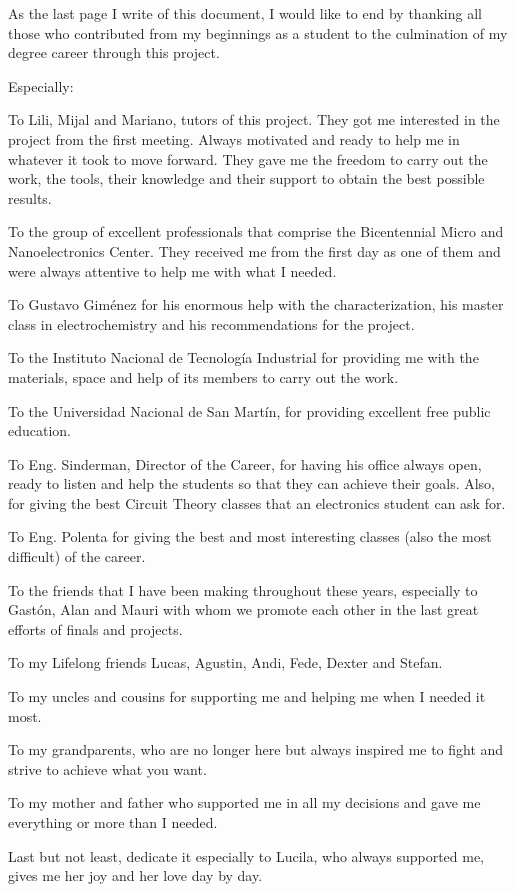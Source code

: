 
As the last page I write of this document, I would like to end by thanking all those who contributed from my beginnings as a student to the culmination of my degree career through this project.

Especially:

To Lili, Mijal and Mariano, tutors of this project. They got me interested in the project from the first meeting. Always motivated and ready to help me in whatever it took to move forward. They gave me the freedom to carry out the work, the tools, their knowledge and their support to obtain the best possible results.

To the group of excellent professionals that comprise the Bicentennial Micro and Nanoelectronics Center. They received me from the first day as one of them and were always attentive to help me with what I needed.

To Gustavo Giménez for his enormous help with the characterization, his master class in electrochemistry and his recommendations for the project.

To the Instituto Nacional de Tecnología Industrial for providing me with the materials, space and help of its members to carry out the work.

To the Universidad Nacional de San Martín, for providing excellent free public education.

To Eng. Sinderman, Director of the Career, for having his office always open, ready to listen and help the students so that they can achieve their goals. Also, for giving the best Circuit Theory classes that an electronics student can ask for.

To Eng. Polenta for giving the best and most interesting classes (also the most difficult) of the career.

To the friends that I have been making throughout these years, especially to Gastón, Alan and Mauri with whom we promote each other in the last great efforts of finals and projects.

To my Lifelong friends Lucas, Agustin, Andi, Fede, Dexter and Stefan.

To my uncles and cousins for supporting me and helping me when I needed it most.

To my grandparents, who are no longer here but always inspired me to fight and strive to achieve what you want.

To my mother and father who supported me in all my decisions and gave me everything or more than I needed.

Last but not least, dedicate it especially to Lucila, who always supported me, gives me her joy and her love day by day.